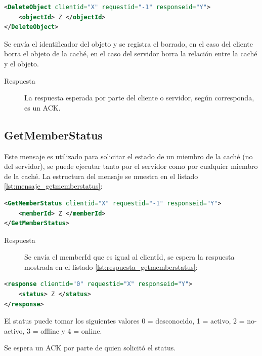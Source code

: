 \begin{lstlisting}[language=XML,caption={Mensaje de DeleteObject},label={lst:mensaje_deleteobject}]
<DeleteObject clientid="X" requestid="-1" responseid="Y"> 
	<objectId> Z </objectId>
</DeleteObject>
\end{lstlisting}

Se envía el identificador del objeto y se registra el borrado, en el caso del cliente borra el objeto de la caché, en el caso del servidor borra la relación entre la caché y el objeto.

\begin{description}
\item[Respuesta] La respuesta esperada por parte del cliente o servidor, según corresponda, es un ACK.
\end{description}

\subsection{GetMemberStatus}
\label{GetMemberStatus} 
Este mensaje es utilizado para solicitar el estado de un miembro de la caché (no del servidor), se puede ejecutar tanto por el servidor como por cualquier miembro de la caché. La estructura del mensaje se muestra en el listado \ref{lst:mensaje_getmemberstatus}:

\begin{lstlisting}[language=XML,caption={Mensaje de GetMemberStatus},label={lst:mensaje_getmemberstatus}]
<GetMemberStatus clientid="X" requestid="-1" responseid="Y"> 
	<memberId> Z </memberId>
</GetMemberStatus>
\end{lstlisting}

\begin{description}
\item[Respuesta] Se envía el memberId que es igual al clientId, se espera la respuesta mostrada en el listado \ref{lst:respuesta_getmemberstatus}:
\end{description}

\begin{lstlisting}[language=XML,caption={Mensaje de Respuesta de GetMemberStatus},label={lst:respuesta_getmemberstatus}]
<response clientid="0" requestid="X" responseid="Y"> 
	<status> Z </status>
</response>
\end{lstlisting}

El status puede tomar los siguientes valores 0 = desconocido, 1 = activo, 2 = no-activo, 3 = offline y 4 = online.

Se espera un ACK por parte de quien solicitó el status.

